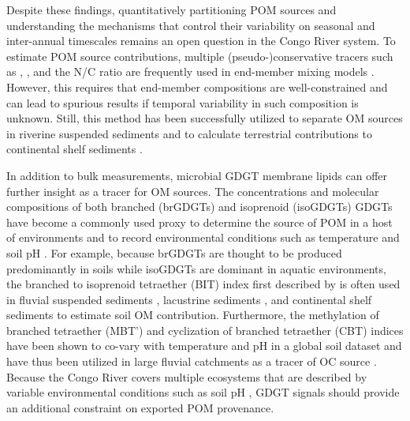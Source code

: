 Despite these findings, quantitatively partitioning POM sources and understanding the mechanisms that control their variability on seasonal and inter-annual timescales remains an open question in the Congo River system. To estimate POM source contributions, multiple (pseudo-)conservative tracers such as , , and the N/C ratio are frequently used in end-member mixing models \citep{Perdue:2007fn,Weijers:2009iu,Hilton:2010cg,Hossler:2012jh}. However, this requires that end-member compositions are well-constrained and can lead to spurious results if temporal variability in such composition is unknown. Still, this method has been successfully utilized to separate OM sources in riverine suspended sediments \citep{Hilton:2010cg,Hossler:2012jh} and to calculate terrestrial contributions to continental shelf sediments \citep{Gordon:2004id,Weijers:2009iu}. 

In addition to bulk measurements, microbial GDGT membrane lipids can offer further insight as a tracer for OM sources. The concentrations and molecular compositions of both branched (brGDGTs) and isoprenoid (isoGDGTs) GDGTs have become a commonly used proxy to determine the source of POM in a host of environments and to record environmental conditions such as temperature and soil pH \citep[see][for review]{Castaneda:2011jb,Schouten:2013bd}. For example, because brGDGTs are thought to be produced predominantly in soils while isoGDGTs are dominant in aquatic environments, the branched to isoprenoid tetraether (BIT) index first described by \citet{Hopmans:2004kx} is often used in fluvial suspended sediments \citep{Kim:2012fq,Zell:2014gt}, lacustrine sediments \citep{Tierney:2010br}, and continental shelf sediments \citep{Peterse:2009hl,Weijers:2009iu} to estimate soil OM contribution. Furthermore, the methylation of branched tetraether (MBT') and cyclization of branched tetraether (CBT) indices have been shown to co-vary with temperature and pH in a global soil dataset \citep{Weijers:2007gu,Peterse:2012bs,DeJonge:2014kw} and have thus been utilized in large fluvial catchments as a tracer of OC source \citep{Zell:2013eg,DeJonge:2014fs}. Because the Congo River covers multiple ecosystems that are described by variable environmental conditions such as soil pH \citep{Mayaux:2004uw,Spencer:2012en}, GDGT signals should provide an additional constraint on exported POM provenance.

